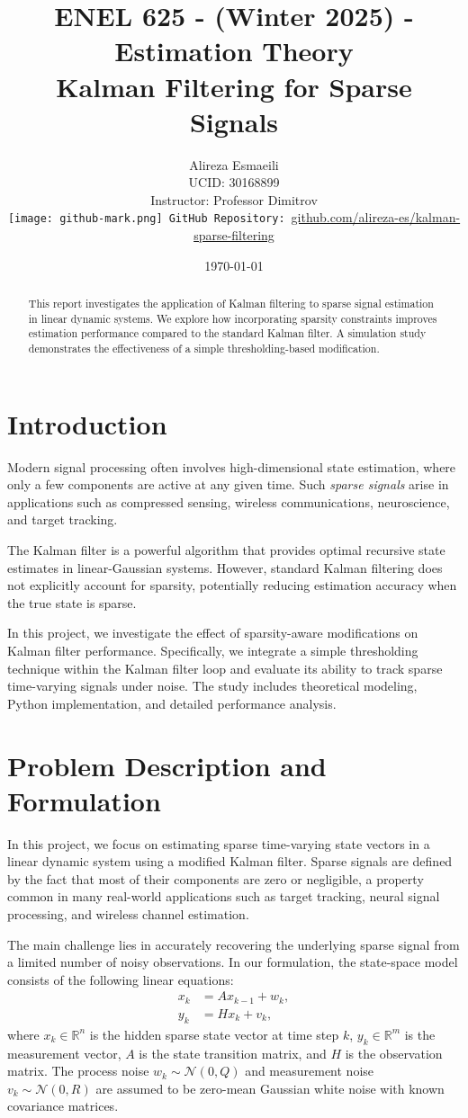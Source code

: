 \documentclass[12pt]{article}
\title{ENEL 625 - (Winter 2025) - Estimation Theory \\ Kalman Filtering for Sparse Signals}
\author{
Alireza Esmaeili \\
UCID: 30168899 \\
Instructor: Professor Dimitrov \\
\texttt{[image: github-mark.png]}~\texttt{GitHub Repository:}~\href{https://github.com/alireza-es/kalman-sparse-filtering}{github.com/alireza-es/kalman-sparse-filtering}
}
\date{\today}
\begin{document}
\maketitle

\begin{abstract}
This report investigates the application of Kalman filtering to sparse signal estimation in linear dynamic systems. We explore how incorporating sparsity constraints improves estimation performance compared to the standard Kalman filter. A simulation study demonstrates the effectiveness of a simple thresholding-based modification.
\end{abstract}

\section{Introduction}
Modern signal processing often involves high-dimensional state estimation, where only a few components are active at any given time. Such \textit{sparse signals} arise in applications such as compressed sensing, wireless communications, neuroscience, and target tracking.

The Kalman filter is a powerful algorithm that provides optimal recursive state estimates in linear-Gaussian systems. However, standard Kalman filtering does not explicitly account for sparsity, potentially reducing estimation accuracy when the true state is sparse.

In this project, we investigate the effect of sparsity-aware modifications on Kalman filter performance. Specifically, we integrate a simple thresholding technique within the Kalman filter loop and evaluate its ability to track sparse time-varying signals under noise. The study includes theoretical modeling, Python implementation, and detailed performance analysis.

\section{Problem Description and Formulation}
In this project, we focus on estimating sparse time-varying state vectors in a linear dynamic system using a modified Kalman filter. Sparse signals are defined by the fact that most of their components are zero or negligible, a property common in many real-world applications such as target tracking, neural signal processing, and wireless channel estimation.

The main challenge lies in accurately recovering the underlying sparse signal from a limited number of noisy observations. In our formulation, the state-space model consists of the following linear equations:
\begin{align}
    x_k &= A x_{k-1} + w_k, \\
    y_k &= H x_k + v_k,
\end{align}
where $x_k \in \mathbb{R}^n$ is the hidden sparse state vector at time step $k$, $y_k \in \mathbb{R}^m$ is the measurement vector, $A$ is the state transition matrix, and $H$ is the observation matrix. The process noise $w_k \sim \mathcal{N}(0, Q)$ and measurement noise $v_k \sim \mathcal{N}(0, R)$ are assumed to be zero-mean Gaussian white noise with known covariance matrices.
\end{document}
